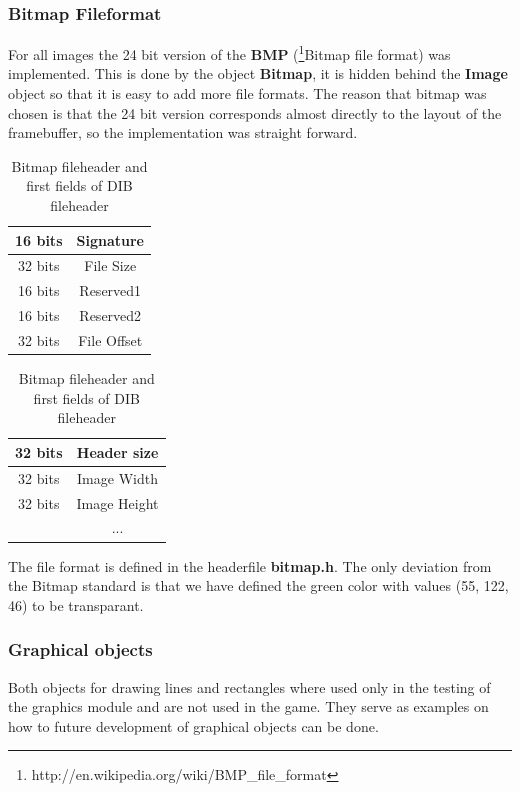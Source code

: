 \subsubsection{Bitmap Fileformat}
For all images the 24 bit version of the {\bf BMP}
(\footnote{http://en.wikipedia.org/wiki/BMP\_file\_format}{Bitmap file format}) was implemented.
This is done by the object {\bf Bitmap}, it is hidden behind the {\bf Image} object so that it is
easy to add more file formats. The reason that bitmap was chosen is that the 24 bit version
corresponds almost directly to the layout of the framebuffer, so the implementation was straight
forward.

\begin{table}[h]
  \centering
  \begin{tabular}{c|c|}
    \hline
    16 bits&Signature \\
    \hline
    32 bits&File Size \\
    \hline
    16 bits&Reserved1 \\
    \hline
    16 bits&Reserved2 \\
    \hline
    32 bits&File Offset \\
    \hline
  \end{tabular}
  \qquad
  \begin{tabular}{c|c|}
    \hline
    32 bits&Header size \\
    \hline
    32 bits&Image Width \\
    \hline
    32 bits&Image Height \\
    \hline
    & ...  \\
  \end{tabular}
  \caption{Bitmap fileheader and first fields of DIB fileheader}
\end{table}

The file format is defined in the headerfile {\bf bitmap.h}. The only deviation from the Bitmap
standard is that we have defined the green color with values (55, 122, 46) to be transparant.

\subsubsection{Graphical objects}
Both objects for drawing lines and rectangles where used only in the testing of the graphics module
and are not used in the game. They serve as examples on how to future development of graphical
objects can be done.
